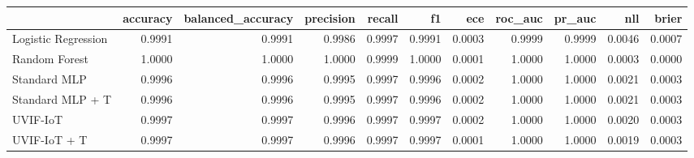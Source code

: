 \begin{tabular}{lrrrrrrrrrr}
\toprule
 & accuracy & balanced_accuracy & precision & recall & f1 & ece & roc_auc & pr_auc & nll & brier \\
\midrule
Logistic Regression & 0.9991 & 0.9991 & 0.9986 & 0.9997 & 0.9991 & 0.0003 & 0.9999 & 0.9999 & 0.0046 & 0.0007 \\
Random Forest & 1.0000 & 1.0000 & 1.0000 & 0.9999 & 1.0000 & 0.0001 & 1.0000 & 1.0000 & 0.0003 & 0.0000 \\
Standard MLP & 0.9996 & 0.9996 & 0.9995 & 0.9997 & 0.9996 & 0.0002 & 1.0000 & 1.0000 & 0.0021 & 0.0003 \\
Standard MLP + T & 0.9996 & 0.9996 & 0.9995 & 0.9997 & 0.9996 & 0.0002 & 1.0000 & 1.0000 & 0.0021 & 0.0003 \\
UVIF-IoT & 0.9997 & 0.9997 & 0.9996 & 0.9997 & 0.9997 & 0.0002 & 1.0000 & 1.0000 & 0.0020 & 0.0003 \\
UVIF-IoT + T & 0.9997 & 0.9997 & 0.9996 & 0.9997 & 0.9997 & 0.0001 & 1.0000 & 1.0000 & 0.0019 & 0.0003 \\
\bottomrule
\end{tabular}
